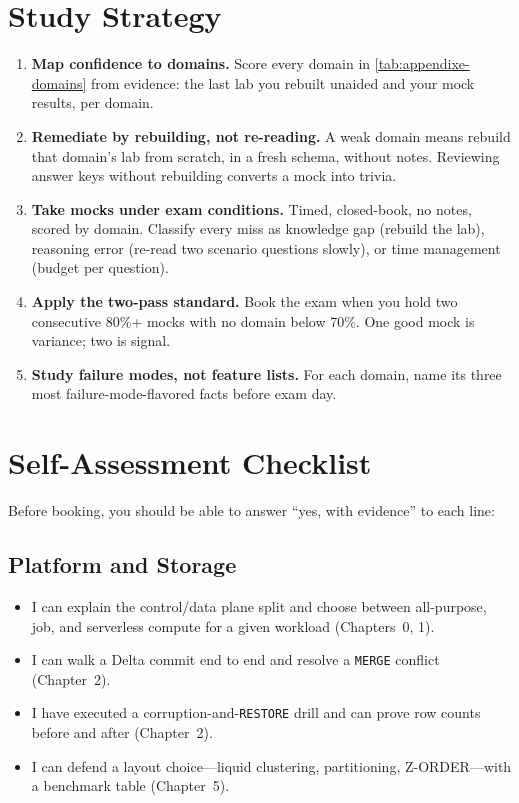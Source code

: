 \section{Study Strategy}
%
\begin{enumerate}
    \item \textbf{Map confidence to domains.} Score every domain in
    \cref{tab:appendixe-domains} from evidence: the last lab you rebuilt unaided and your
    mock results, per domain.
    \item \textbf{Remediate by rebuilding, not re-reading.} A weak domain means rebuild that
    domain's lab from scratch, in a fresh schema, without notes. Reviewing answer keys
    without rebuilding converts a mock into trivia.
    \item \textbf{Take mocks under exam conditions.} Timed, closed-book, no notes, scored by
    domain. Classify every miss as knowledge gap (rebuild the lab), reasoning error
    (re-read two scenario questions slowly), or time management (budget per question).
    \item \textbf{Apply the two-pass standard.} Book the exam when you hold two consecutive
    80\%+ mocks with no domain below 70\%. One good mock is variance; two is signal.
    \item \textbf{Study failure modes, not feature lists.} For each domain, name its three
    most failure-mode-flavored facts before exam day.
\end{enumerate}

\section{Self-Assessment Checklist}
%
Before booking, you should be able to answer ``yes, with evidence'' to each line:

\subsection*{Platform and Storage}
\begin{itemize}
    \item[$\square$] I can explain the control/data plane split and choose between all-purpose,
    job, and serverless compute for a given workload (Chapters~0, 1).
    \item[$\square$] I can walk a Delta commit end to end and resolve a \texttt{MERGE}
    conflict (Chapter~2).
    \item[$\square$] I have executed a corruption-and-\texttt{RESTORE} drill and can prove row
    counts before and after (Chapter~2).
    \item[$\square$] I can defend a layout choice---liquid clustering, partitioning, Z-ORDER---with
    a benchmark table (Chapter~5).
\end{itemize}

